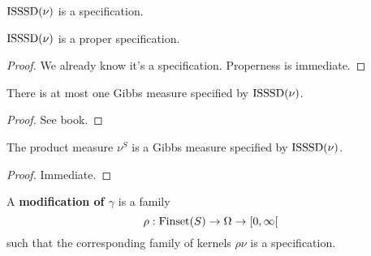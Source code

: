 \begin{definition}
    \label{def:isssd-specification}
    \leanok

    $\operatorname{ISSSD}(\nu)$ is a specification.
\end{definition}

\begin{lemma}
    \label{lem:isssd-proper-specification}
    \leanok

    $\operatorname{ISSSD}(\nu)$ is a proper specification.
\end{lemma}
\begin{proof}

    We already know it's a specification. Properness is immediate.
\end{proof}

\begin{lemma}
    \label{lem:isssd-gibbs-measure-uniqueness}

    There is at most one Gibbs measure specified by $\operatorname{ISSSD}(\nu)$.
\end{lemma}
\begin{proof}

    See book.
\end{proof}

\begin{lemma}
    \label{lem:isssd-gibbs-measure-existence}

    The product measure $\nu^S$ is a Gibbs measure specified by $\operatorname{ISSSD}(\nu)$.
\end{lemma}
\begin{proof}

   Immediate.
\end{proof}

\begin{definition}[Modification]
    \label{def:modification}
    \leanok

    A {\bf modification of $\gamma$} is a family
    $$\rho : \operatorname{Finset}(S) \to \Omega \to [0, \infty[$$
    such that the corresponding family of kernels $\rho\nu$ is a specification.
\end{definition}

